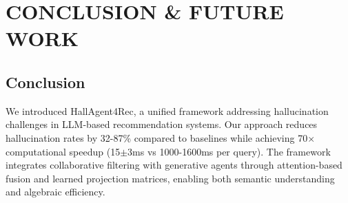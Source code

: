 \documentclass[acmsmall]{acmart}
\begin{document}




\section{CONCLUSION \& FUTURE WORK}

\subsection{Conclusion}
We introduced HallAgent4Rec, a unified framework addressing hallucination challenges in LLM-based recommendation systems. Our approach reduces hallucination rates by 32-87\% compared to baselines while achieving 70$\times$ computational speedup (15$\pm$3ms vs 1000-1600ms per query). The framework integrates collaborative filtering with generative agents through attention-based fusion and learned projection matrices, enabling both semantic understanding and algebraic efficiency.
\end{document}
